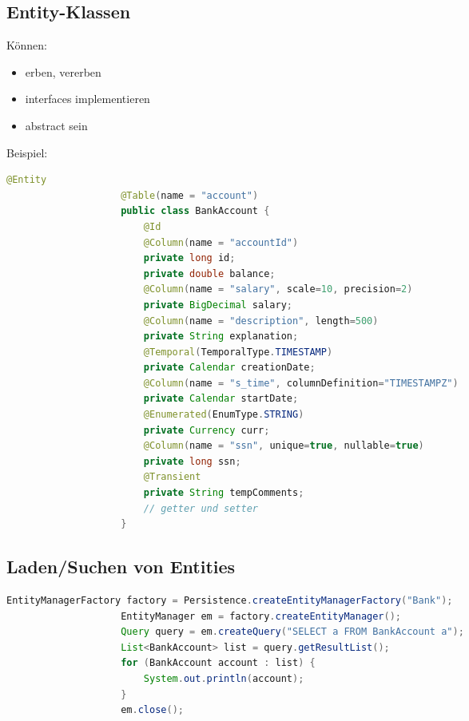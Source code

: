 \documentclass[a4paper, landscape, 8pt]{scrartcl}
\begin{document}
\begin{multicols*}{4}
        \subsection{Entity-Klassen}
        Können:
        \begin{itemize}
            \item erben, vererben
            \item interfaces implementieren
            \item abstract sein
        \end{itemize}
        Beispiel:
        \begin{lstlisting}[language=java]
                    @Entity
                    @Table(name = "account")
                    public class BankAccount {
                        @Id
                        @Column(name = "accountId")
                        private long id;
                        private double balance;
                        @Column(name = "salary", scale=10, precision=2)
                        private BigDecimal salary;
                        @Column(name = "description", length=500)
                        private String explanation;
                        @Temporal(TemporalType.TIMESTAMP)
                        private Calendar creationDate;
                        @Column(name = "s_time", columnDefinition="TIMESTAMPZ")
                        private Calendar startDate;
                        @Enumerated(EnumType.STRING)
                        private Currency curr;
                        @Column(name = "ssn", unique=true, nullable=true)
                        private long ssn;
                        @Transient
                        private String tempComments;
                        // getter und setter
                    }
        \end{lstlisting}

        \subsection{Laden/Suchen von Entities}
        \begin{lstlisting}[language=java]
                    EntityManagerFactory factory = Persistence.createEntityManagerFactory("Bank");
                    EntityManager em = factory.createEntityManager();
                    Query query = em.createQuery("SELECT a FROM BankAccount a");
                    List<BankAccount> list = query.getResultList();
                    for (BankAccount account : list) {
                        System.out.println(account);
                    }
                    em.close();
        \end{lstlisting}


\end{multicols*}
\end{document}

